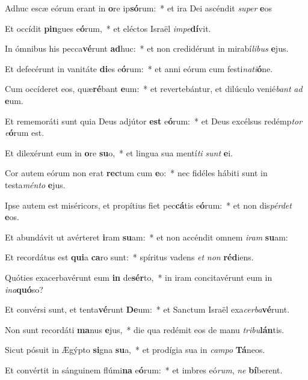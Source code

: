 \item Adhuc escæ eórum erant in \textbf{o}re ip\textbf{só}rum:~* et ira Dei ascéndit \textit{su}\textit{per} \textbf{e}os
\item Et occídit \textbf{pin}gues e\textbf{ó}rum,~* et eléctos Israël \textit{im}\textit{pe}\textbf{dí}vit.
\item In ómnibus his pecca\textbf{vé}runt \textbf{ad}huc:~* et non credidérunt in mirabí\textit{li}\textit{bus} \textbf{e}jus.
\item Et defecérunt in vanitáte \textbf{di}es e\textbf{ó}rum:~* et anni eórum cum festi\textit{na}\textit{ti}\textbf{ó}ne.
\item Cum occíderet eos, quæ\textbf{ré}bant \textbf{e}um:~* et revertebántur, et dilúculo venié\textit{bant} \textit{ad} \textbf{e}um.
\item Et rememoráti sunt quia Deus adjútor \textbf{est} e\textbf{ó}rum:~* et Deus excélsus redémp\textit{tor} \textit{e}\textbf{ó}rum est.
\item Et dilexérunt eum in \textbf{o}re \textbf{su}o,~* et lingua sua mentí\textit{ti} \textit{sunt} \textbf{e}i.
\item Cor autem eórum non erat \textbf{rec}tum cum \textbf{e}o:~* nec fidéles hábiti sunt in testa\textit{mén}\textit{to} \textbf{e}jus.
\item Ipse autem est miséricors, et propítius fiet pec\textbf{cá}tis e\textbf{ó}rum:~* et non dis\textit{pér}\textit{det} \textbf{e}os.
\item Et abundávit ut avérteret \textbf{i}ram \textbf{su}am:~* et non accéndit omnem \textit{i}\textit{ram} \textbf{su}am:
\item Et recordátus est \textbf{qui}a \textbf{ca}ro sunt:~* spíritus vadens \textit{et} \textit{non} \textbf{réd}iens.
\item Quóties exacerbavérunt eum \textbf{in} de\textbf{sér}to,~* in iram concitavérunt eum in \textit{in}\textit{a}\textbf{quó}so?
\item Et convérsi sunt, et tenta\textbf{vé}runt \textbf{De}um:~* et Sanctum Israël exa\textit{cer}\textit{ba}\textbf{vé}runt.
\item Non sunt recordáti \textbf{ma}nus \textbf{e}jus,~* die qua redémit eos de manu \textit{tri}\textit{bu}\textbf{lán}tis.
\item Sicut pósuit in Ægýpto \textbf{si}gna \textbf{su}a,~* et prodígia sua in \textit{cam}\textit{po} \textbf{Tá}neos.
\item Et convértit in sánguinem flúmi\textbf{na} e\textbf{ó}rum:~* et imbres eó\textit{rum}, \textit{ne} \textbf{bí}berent.
